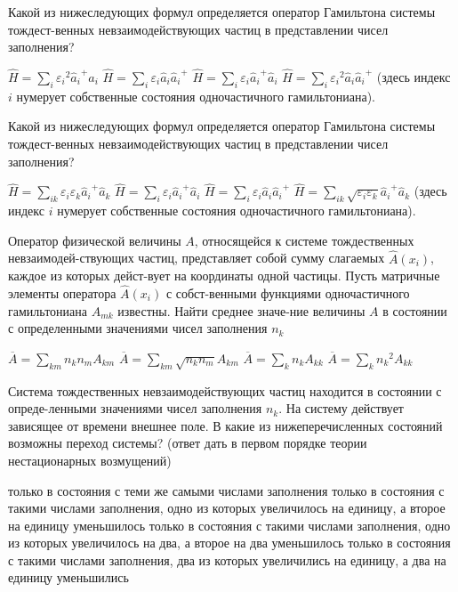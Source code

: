 \documentclass[11pt,a4paper]{exam}
\begin{document}
\begin{questions}
\question Какой из нижеследующих формул определяется оператор Гамильтона системы тождест-венных невзаимодействующих частиц в представлении чисел заполнения?
\begin{choices}
\choice $\hat H = \sum\limits_i {{\varepsilon _i}^2{{\hat a}_i}^ + } {\hat a_i}$   
\choice $\hat H = \sum\limits_i {{\varepsilon _i}} {\hat a_i}{\hat a_i}^ + $ 
\choice $\hat H = \sum\limits_i {{\varepsilon _i}{{\hat a}_i}^ + } {\hat a_i}$  
\choice $\hat H = {\sum\limits_i {{\varepsilon _i}} ^2}{\hat a_i}{\hat a_i}^ + $
(здесь индекс $i$ нумерует собственные состояния одночастичного гамильтониана).
\end{choices}

\question Какой из нижеследующих формул определяется оператор Гамильтона системы тождест-венных невзаимодействующих частиц в представлении чисел заполнения?
\begin{choices}
\choice $\hat H = \sum\limits_{ik} {{\varepsilon _i}{\varepsilon _k}{{\hat a}_i}^ + } {\hat a_k}$ 
\choice $\hat H = \sum\limits_i {{\varepsilon _i}} {\hat a_i}^ + {\hat a_i}$ 
\choice $\hat H = \sum\limits_i {{\varepsilon _i}{{\hat a}_i}} {\hat a_i}^ + $  
\choice $\hat H = \sum\limits_{ik} {\sqrt {{\varepsilon _i}{\varepsilon _k}} {{\hat a}_i}^ + } {\hat a_k}$
(здесь индекс $i$ нумерует собственные состояния одночастичного гамильтониана).
\end{choices}

\question Оператор физической величины $A$, относящейся к системе тождественных невзаимодей-ствующих частиц, представляет собой сумму слагаемых $\hat A({x_i})$, каждое из которых дейст-вует на координаты одной частицы. Пусть матричные элементы оператора $\hat A({x_i})$ с собст-венными функциями одночастичного гамильтониана ${A_{mk}}$ известны. Найти среднее значе-ние величины $A$ в состоянии с определенными значениями чисел заполнения ${n_k}$
\begin{choices}
\choice $\overline A  = \sum\limits_{km} {{n_k}{n_m}{A_{km}}} $  
\choice $\overline A  = \sum\limits_{km} {\sqrt {{n_k}{n_m}} {A_{km}}} $  
\choice $\overline A  = \sum\limits_k {{n_k}{A_{kk}}} $ 
\choice $\overline A  = \sum\limits_k {{n_k}^2{A_{kk}}} $
\end{choices}

\question Система тождественных невзаимодействующих частиц находится в состоянии с опреде-ленными значениями чисел заполнения ${n_k}$. На систему действует зависящее от времени внешнее поле. В какие из нижеперечисленных состояний возможны переход системы? (ответ дать в первом порядке теории нестационарных возмущений)
\begin{choices}
\choice только в состояния с теми же самыми числами заполнения
\choice только в состояния с такими числами заполнения, одно из которых увеличилось на единицу, а второе на единицу уменьшилось
\choice только в состояния с такими числами заполнения, одно из которых увеличилось на два, а второе на два уменьшилось
\choice только в состояния с такими числами заполнения, два из которых увеличились на единицу, а два на единицу уменьшились
\end{choices}


\end{questions}
\end{document}
